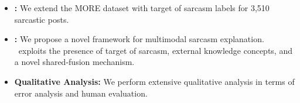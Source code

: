 \begin{itemize}[leftmargin=*, noitemsep, nolistsep]
    \item \textbf{\dataset:} We extend the MORE dataset with target of sarcasm labels for 3,510 sarcastic posts. 
    \item \textbf{\model:} We propose a novel framework for multimodal sarcasm explanation. \model\ exploits the presence of target of sarcasm, external knowledge concepts, and a novel shared-fusion mechanism. 
    \item \textbf{Qualitative Analysis:} We perform extensive qualitative analysis in terms of error analysis and human evaluation.

    
\end{itemize}

